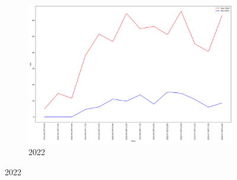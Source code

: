\begin{figure}[h]
	\begin{subfigure}{0.45\textwidth}
		\centering
		\includegraphics[width=\textwidth]{graphs/2022/FWIX_maxMin.png}
		\caption{2022}
	\end{subfigure}
	
	\label{fig:daily_fwix_maxmin}
\end{figure}

